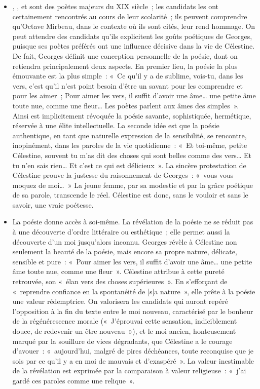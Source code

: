 {\begin{itemize}[label=\textbullet]
\item {}, ,  et  sont des poètes majeurs du XIX\ieme{} siècle~;
les candidats les ont certainement rencontrés au cours de leur scolarité~; ils peuvent
comprendre qu'Octave Mirbeau, dans le contexte où ils sont cités, leur rend hommage.
On peut attendre des candidats qu'ils explicitent les goûts poétiques de Georges,
puisque ses poètes préférés ont une influence décisive dans la vie de Célestine. De
fait, Georges définit une conception personnelle de la poésie, dont on retiendra
principalement deux aspects. En premier lieu, la poésie la plus émouvante est la plus
simple~: «~Ce qu'il y a de sublime, vois-tu, dans les vers, c'est qu'il n'est point besoin
d'être un savant pour les comprendre et pour les aimer~; Pour aimer les vers, il suffit
d'avoir une âme… une petite âme toute nue, comme une fleur… Les poètes parlent
aux âmes des simples~». Ainsi est implicitement révoquée la poésie savante,
sophistiquée, hermétique, réservée à une élite intellectuelle. La seconde idée est que
la poésie authentique, en tant que naturelle expression de la sensibilité, se rencontre,
inopinément, dans les paroles de la vie quotidienne~: «~Et toi-même, petite Célestine,
souvent tu m'as dit des choses qui sont belles comme des vers… Et tu n'en sais rien…
Et c'est ce qui est délicieux~». La sincère protestation de Célestine prouve la justesse
du raisonnement de Georges~: «~vous vous moquez de moi…~» La jeune femme, par
sa modestie et par la grâce poétique de sa parole, transcende le réel. Célestine est
donc, sans le vouloir et sans le savoir, une vraie poétesse.

\item La poésie donne accès à soi-même. La révélation de la poésie ne se réduit pas à
une découverte d'ordre littéraire ou esthétique~; elle permet aussi la découverte d'un
moi jusqu'alors inconnu. Georges révèle à Célestine non seulement la beauté de la
poésie, mais encore sa propre nature, délicate, sensible et pure~: «~Pour aimer les
vers, il suffit d'avoir une âme… une petite âme toute nue, comme une fleur~». Célestine
attribue à cette pureté retrouvée, son «~élan vers des choses supérieures~». En
s'efforçant de «~reprendre confiance en la spontanéité de [s]a nature~», elle prête à la poésie une valeur rédemptrice. On valorisera les candidats qui auront repéré
l'opposition à la fin du texte entre le moi nouveau, caractérisé par le bonheur de la
régénérescence morale («~J'éprouvai cette sensation, indiciblement douce, de
redevenir un être nouveau~»), et le moi ancien, honteusement marqué par la souillure
de vices dégradants, que Célestine a le courage d'avouer~: «~aujourd'hui, malgré de
pires déchéances, toute reconquise que je sois par ce qu'il y a en moi de mauvais et
d'exaspéré~». La valeur inestimable de la révélation est exprimée par la comparaison
à valeur religieuse~: «~j'ai gardé ces paroles comme une relique~».


\end{itemize}}
